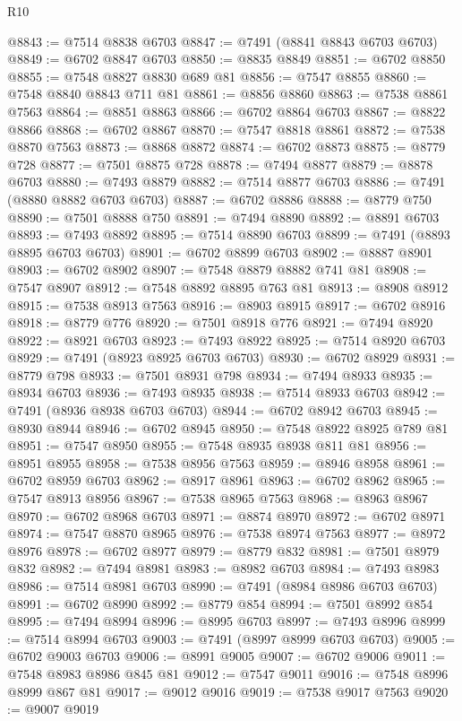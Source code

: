 \begin{lexlean}{R10}
\begin{coremodule}
{{{{{{{{{{{{{{{{{{{{{{{{{{{{{{{{{{{{{{{{{{{{{{{{{{{{{{{{{{{{{{{{{{{{{{{{{{{{{{{{{{{{@8843 := @7514 @8838 @6703
@8847 := @7491 (@8841 @8843 @6703 @6703)
@8849 := @6702 @8847 @6703
@8850 := @8835 @8849
@8851 := @6702 @8850
@8855 := @7548 @8827 @8830 @689 @81
@8856 := @7547 @8855
@8860 := @7548 @8840 @8843 @711 @81
@8861 := @8856 @8860
@8863 := @7538 @8861 @7563
@8864 := @8851 @8863
@8866 := @6702 @8864 @6703
@8867 := @8822 @8866
@8868 := @6702 @8867
@8870 := @7547 @8818 @8861
@8872 := @7538 @8870 @7563
@8873 := @8868 @8872
@8874 := @6702 @8873
@8875 := @8779 @728
@8877 := @7501 @8875 @728
@8878 := @7494 @8877
@8879 := @8878 @6703
@8880 := @7493 @8879
@8882 := @7514 @8877 @6703
@8886 := @7491 (@8880 @8882 @6703 @6703)
@8887 := @6702 @8886
@8888 := @8779 @750
@8890 := @7501 @8888 @750
@8891 := @7494 @8890
@8892 := @8891 @6703
@8893 := @7493 @8892
@8895 := @7514 @8890 @6703
@8899 := @7491 (@8893 @8895 @6703 @6703)
@8901 := @6702 @8899 @6703
@8902 := @8887 @8901
@8903 := @6702 @8902
@8907 := @7548 @8879 @8882 @741 @81
@8908 := @7547 @8907
@8912 := @7548 @8892 @8895 @763 @81
@8913 := @8908 @8912
@8915 := @7538 @8913 @7563
@8916 := @8903 @8915
@8917 := @6702 @8916
@8918 := @8779 @776
@8920 := @7501 @8918 @776
@8921 := @7494 @8920
@8922 := @8921 @6703
@8923 := @7493 @8922
@8925 := @7514 @8920 @6703
@8929 := @7491 (@8923 @8925 @6703 @6703)
@8930 := @6702 @8929
@8931 := @8779 @798
@8933 := @7501 @8931 @798
@8934 := @7494 @8933
@8935 := @8934 @6703
@8936 := @7493 @8935
@8938 := @7514 @8933 @6703
@8942 := @7491 (@8936 @8938 @6703 @6703)
@8944 := @6702 @8942 @6703
@8945 := @8930 @8944
@8946 := @6702 @8945
@8950 := @7548 @8922 @8925 @789 @81
@8951 := @7547 @8950
@8955 := @7548 @8935 @8938 @811 @81
@8956 := @8951 @8955
@8958 := @7538 @8956 @7563
@8959 := @8946 @8958
@8961 := @6702 @8959 @6703
@8962 := @8917 @8961
@8963 := @6702 @8962
@8965 := @7547 @8913 @8956
@8967 := @7538 @8965 @7563
@8968 := @8963 @8967
@8970 := @6702 @8968 @6703
@8971 := @8874 @8970
@8972 := @6702 @8971
@8974 := @7547 @8870 @8965
@8976 := @7538 @8974 @7563
@8977 := @8972 @8976
@8978 := @6702 @8977
@8979 := @8779 @832
@8981 := @7501 @8979 @832
@8982 := @7494 @8981
@8983 := @8982 @6703
@8984 := @7493 @8983
@8986 := @7514 @8981 @6703
@8990 := @7491 (@8984 @8986 @6703 @6703)
@8991 := @6702 @8990
@8992 := @8779 @854
@8994 := @7501 @8992 @854
@8995 := @7494 @8994
@8996 := @8995 @6703
@8997 := @7493 @8996
@8999 := @7514 @8994 @6703
@9003 := @7491 (@8997 @8999 @6703 @6703)
@9005 := @6702 @9003 @6703
@9006 := @8991 @9005
@9007 := @6702 @9006
@9011 := @7548 @8983 @8986 @845 @81
@9012 := @7547 @9011
@9016 := @7548 @8996 @8999 @867 @81
@9017 := @9012 @9016
@9019 := @7538 @9017 @7563
@9020 := @9007 @9019
}}}}}}}}}}}}}}}}}}}}}}}}}}}}}}}}}}}}}}}}}}}}}}}}}}}}}}}}}}}}}}}}}}}}}}}}}}}}}}}}}}}}
\end{coremodule}
\end{lexlean}

